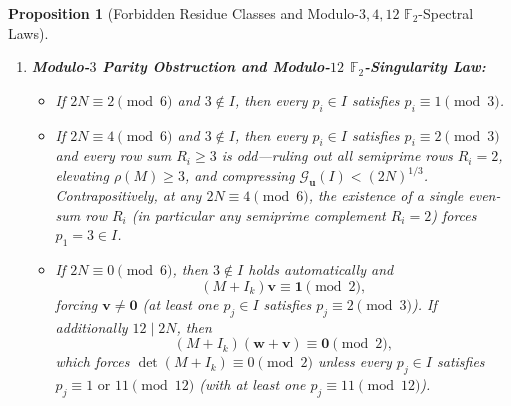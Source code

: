 \documentclass[11pt,a4paper]{article}
\newtheorem{proposition}[theorem]{Proposition}
\theoremstyle{definition}
\begin{document}
\begin{proposition}[Forbidden Residue Classes and Modulo-$3, 4, 12$ $\mathbb{F}_2$-Spectral Laws]
\begin{enumerate}
\begin{itemize}
    \end{itemize}
    \item \textbf{Modulo-$3$ Parity Obstruction and Modulo-$12$ $\mathbb{F}_2$-Singularity Law:}
    \begin{itemize}
        \item If $2N \equiv 2 \pmod 6$ and $3 \notin I$, then every $p_i \in I$ satisfies $p_i \equiv 1 \pmod 3$.
        \item If $2N \equiv 4 \pmod 6$ and $3 \notin I$, then every $p_i \in I$ satisfies $p_i \equiv 2 \pmod 3$ and every row sum $R_i \ge 3$ is odd---ruling out all semiprime rows $R_i = 2$, elevating $\rho(M) \ge 3$, and compressing $\mathcal{G}_{\mathbf{u}}(I) < (2N)^{1/3}$. Contrapositively, at any $2N \equiv 4 \pmod 6$, the existence of a single even-sum row $R_i$ (in particular any semiprime complement $R_i = 2$) forces $p_1 = 3 \in I$.
        \item If $2N \equiv 0 \pmod 6$, then $3 \notin I$ holds automatically and
        \begin{equation}
        \label{eq:f2_mod3_law}
        (M + I_k)\mathbf{v} \equiv \mathbf{1} \pmod 2,
        \end{equation}
        forcing $\mathbf{v} \neq \mathbf{0}$ (at least one $p_j \in I$ satisfies $p_j \equiv 2 \pmod 3$). If additionally $12 \mid 2N$, then
        \begin{equation}
        \label{eq:f2_mod12_singularity}
        (M + I_k)(\mathbf{w} + \mathbf{v}) \equiv \mathbf{0} \pmod 2,
        \end{equation}
        which forces $\det(M + I_k) \equiv 0 \pmod 2$ unless every $p_j \in I$ satisfies $p_j \equiv 1 \text{ or } 11 \pmod{12}$ (with at least one $p_j \equiv 11 \pmod{12}$).
    \end{itemize}
\end{enumerate}
\end{proposition}
\end{document}

